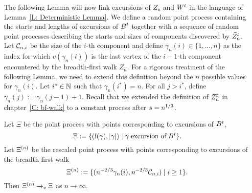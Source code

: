 The following Lemma will now link excursions of $Z_n$ and $W^t$ in the language of Lemma~\ref{L: Deterministic Lemma}.
We define a random point process containing the starts and lengths of excursions of $B^t$ together with a sequence of random point processes describing the starts and sizes of components discovered by $\bar{Z}^t_n$.
Let $\mathcal{C}_{n,i}$ be the size of the $i$-th component and
define $\gamma_n(i) \in \{1, \dots, n\}$ as the index for which
$v(\gamma_n(i))$ is the last vertex of the $i-1$-th component encountered by the breadth-first walk $Z_n$.
For a rigorous treatment of the following Lemma, we need to extend this definition beyond the $n$ possible values for $\gamma_n(i)$.
Let $i^* \in \mathbb{N}$ such that $\gamma_n(i^*) = n$. For all $j > i^*$, define $\gamma_n(j) := \gamma_n(j-1) + 1$.
Recall that we extended the definition of $\bar{Z}^t_n$ in chapter~\ref{C: bf-walk} to a constant process after $s=n^{1 / 3}$.

\begin{lemma} \label{L: Lemma 8}
	Let $\Xi$ be the point process with points corresponding to excursions of $B^t$,
	\begin{equation} \label{E: Lemma 8 def Xi}
	\Xi := \{ (l(\gamma), |\gamma|) \; | \; \gamma \; \text{excursion of} \; B^t \}.
	\end{equation}
	Let $\Xi^{(n)}$ be the rescaled point process with points corresponding to excursions of the breadth-first walk
	\begin{equation} \label{E: Lemma 8 def Xin}
	\Xi^{(n)} := \{ ( n^{-2 / 3} \gamma_n(i), n^{-2 / 3} \mathcal{C}_{n,i} ) \; | \; i \geq 1 \}.
	\end{equation}
	Then $\Xi^{(n)} \rightarrow_v \Xi$ as $n \rightarrow \infty$.
\end{lemma}

